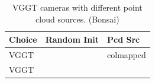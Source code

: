 \begin{table}[H]
\caption{VGGT cameras with different point cloud sources. (Bonsai)}
\label{tab:06_isolated_cams_vggt_bonsai}
\begin{tabular}{lrl}
\toprule
Choice & Random Init & Pcd Src \\
\midrule
VGGT &  & colmappcd \\
VGGT &  &  \\
\bottomrule
\end{tabular}
\end{table}
